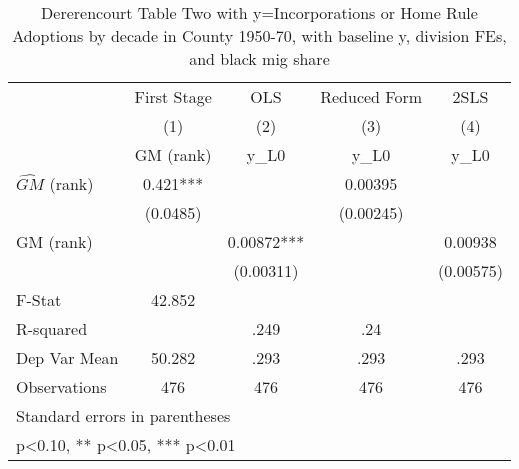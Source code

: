 \begin{table}[htbp]\centering
\def\sym#1{\ifmmode^{#1}\else\(^{#1}\)\fi}
\caption{Dererencourt Table Two with y=Incorporations or Home Rule Adoptions by decade in County 1950-70, with baseline y, division FEs, and black mig share}
\begin{tabular}{l*{4}{c}}
\toprule
                    & First Stage   &         OLS   &Reduced Form   &        2SLS   \\
                    &\multicolumn{1}{c}{(1)}&\multicolumn{1}{c}{(2)}&\multicolumn{1}{c}{(3)}&\multicolumn{1}{c}{(4)}\\
                    &\multicolumn{1}{c}{GM  (rank)}&\multicolumn{1}{c}{y\_L0}&\multicolumn{1}{c}{y\_L0}&\multicolumn{1}{c}{y\_L0}\\
\midrule
$\hat{GM}$ (rank)   &       0.421***&               &     0.00395   &               \\
                    &    (0.0485)   &               &   (0.00245)   &               \\
\addlinespace
GM  (rank)          &               &     0.00872***&               &     0.00938   \\
                    &               &   (0.00311)   &               &   (0.00575)   \\
\midrule
F-Stat              &      42.852   &               &               &               \\
R-squared           &               &        .249   &         .24   &               \\
Dep Var Mean        &      50.282   &        .293   &        .293   &        .293   \\
Observations        &         476   &         476   &         476   &         476   \\
\bottomrule
\multicolumn{5}{l}{\footnotesize Standard errors in parentheses}\\
\multicolumn{5}{l}{\footnotesize * p<0.10, ** p<0.05, *** p<0.01}\\
\end{tabular}
\end{table}
